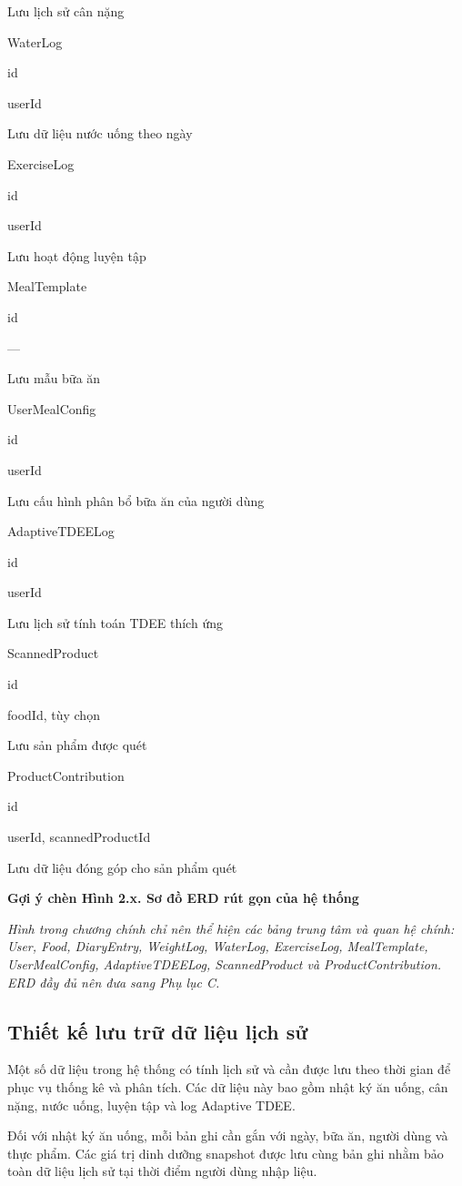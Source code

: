 \documentclass[12pt, a4paper]{report}
\begin{document}
Lưu lịch sử cân nặng

WaterLog

id

userId

Lưu dữ liệu nước uống theo ngày

ExerciseLog

id

userId

Lưu hoạt động luyện tập

MealTemplate

id

—

Lưu mẫu bữa ăn

UserMealConfig

id

userId

Lưu cấu hình phân bổ bữa ăn của người dùng

AdaptiveTDEELog

id

userId

Lưu lịch sử tính toán TDEE thích ứng

ScannedProduct

id

foodId, tùy chọn

Lưu sản phẩm được quét

ProductContribution

id

userId, scannedProductId

Lưu dữ liệu đóng góp cho sản phẩm quét

\textbf{Gợi ý chèn Hình 2.x. Sơ đồ ERD rút gọn của hệ thống}

\textit{Hình trong chương chính chỉ nên thể hiện các bảng trung tâm và quan hệ chính: User, Food, DiaryEntry, WeightLog, WaterLog, ExerciseLog, MealTemplate, UserMealConfig, AdaptiveTDEELog, ScannedProduct và ProductContribution. ERD đầy đủ nên đưa sang Phụ lục C.}

\subsection{Thiết kế lưu trữ dữ liệu lịch sử}Một số dữ liệu trong hệ thống có tính lịch sử và cần được lưu theo thời gian để phục vụ thống kê và phân tích. Các dữ liệu này bao gồm nhật ký ăn uống, cân nặng, nước uống, luyện tập và log Adaptive TDEE.

Đối với nhật ký ăn uống, mỗi bản ghi cần gắn với ngày, bữa ăn, người dùng và thực phẩm. Các giá trị dinh dưỡng snapshot được lưu cùng bản ghi nhằm bảo toàn dữ liệu lịch sử tại thời điểm người dùng nhập liệu.
\end{document}
